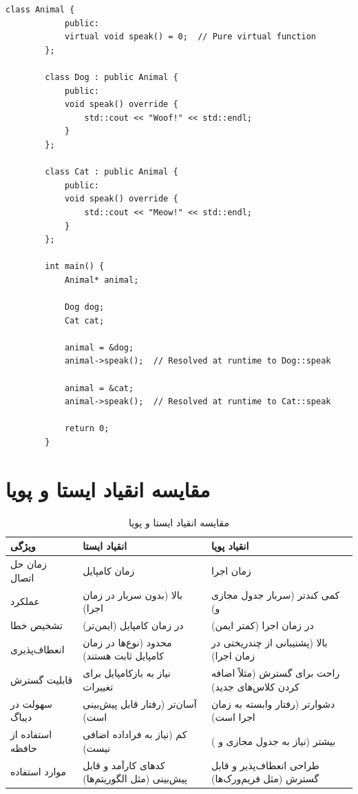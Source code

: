 \documentclass[12pt, a4paper]{report}
\begin{document}
\begin{LTR} %
	\begin{lstlisting}[breaklines=true]
		class Animal {
			public:
			virtual void speak() = 0;  // Pure virtual function
		};
		
		class Dog : public Animal {
			public:
			void speak() override {
				std::cout << "Woof!" << std::endl;
			}
		};
		
		class Cat : public Animal {
			public:
			void speak() override {
				std::cout << "Meow!" << std::endl;
			}
		};
		
		int main() {
			Animal* animal;
			
			Dog dog;
			Cat cat;
			
			animal = &dog;
			animal->speak();  // Resolved at runtime to Dog::speak
			
			animal = &cat;
			animal->speak();  // Resolved at runtime to Cat::speak
			
			return 0;
		}
	\end{lstlisting}
\end{LTR}
\section{مقایسه انقیاد ایستا و پویا}

\begin{table}[h!]
	\centering
	\begin{tabular}{|p{3cm}|p{5cm}|p{5cm}|}
		\hline
		\textbf{ویژگی} & \textbf{انقیاد ایستا} & \textbf{انقیاد پویا} \\
		\hline
		زمان حل اتصال & زمان کامپایل & زمان اجرا \\
		\hline
		عملکرد & بالا (بدون سربار در زمان اجرا) & کمی کندتر (سربار جدول مجازی و\lr{ RTTI}) \\
		\hline
		تشخیص خطا & در زمان کامپایل (ایمن‌تر) & در زمان اجرا (کمتر ایمن) \\
		\hline
		انعطاف‌پذیری & محدود (نوع‌ها در زمان کامپایل ثابت هستند) & بالا (پشتیبانی از چندریختی در زمان اجرا) \\
		\hline
		قابلیت گسترش & نیاز به بازکامپایل برای تغییرات & راحت برای گسترش (مثلاً اضافه کردن کلاس‌های جدید) \\
		\hline
		سهولت در دیباگ & آسان‌تر (رفتار قابل پیش‌بینی است) & دشوارتر (رفتار وابسته به زمان اجرا است) \\
		\hline
		استفاده از حافظه & کم (نیاز به فراداده اضافی نیست) & بیشتر (نیاز به جدول مجازی و \lr{RTTI}) \\
		\hline
		موارد استفاده & کدهای کارآمد و قابل پیش‌بینی (مثل الگوریتم‌ها) & طراحی انعطاف‌پذیر و قابل گسترش (مثل فریم‌ورک‌ها) \\
		\hline
	\end{tabular}
	\caption{مقایسه انقیاد ایستا و پویا}
	\label{tab:static_dynamic_binding}
\end{table}
\end{document}
